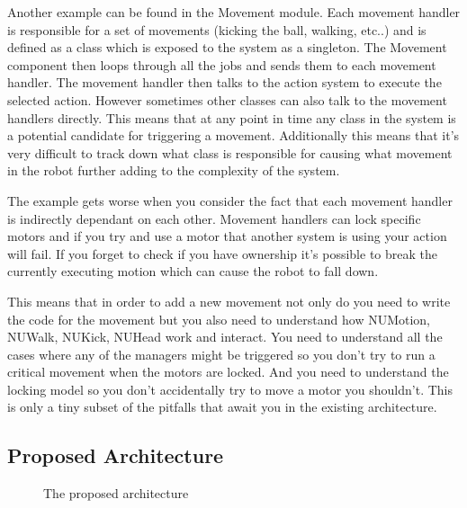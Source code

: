 \documentclass[english,12pt]{scrartcl}
\begin{document}
			Another example can be found in the Movement module.
			Each movement handler is responsible for a set of movements (kicking the ball, walking,
			etc..) and is defined as a class which is exposed to the system as a singleton. The
			Movement component then loops through all the jobs and sends them to each movement
			handler. The movement handler then talks to the action system to execute the selected
			action. However sometimes other classes can also talk to the movement handlers directly.
			This means that at any point in time any class in the system is a potential candidate
			for triggering a movement. Additionally this means that it's very difficult to track
			down what class is responsible for causing what movement in the robot further adding to
			the complexity of the system.

			The example gets worse when you consider the fact that each movement handler is
			indirectly dependant on each other. Movement handlers can lock specific motors and if
			you try and use a motor that another system is using your action will fail. If you
			forget to check if you have ownership it's possible to break the currently executing
			motion which can cause the robot to fall down.

			This means that in order to add a new movement not only do you need to write the code for the movement
			but you also need to understand how NUMotion, NUWalk, NUKick, NUHead work and interact.
			You need to understand all the cases where any of the managers might be triggered so you
			don't try to run a critical movement when the motors are locked. And you need to
			understand the locking model so you don't accidentally try to move a motor you
			shouldn't. This is only a tiny subset of the pitfalls that await you in the existing
			architecture.

			
		\subsection{Proposed Architecture}
			\begin{figure}[h]
				\centering
				\caption {The proposed architecture}
				\label{fig:HighLevelProposedArchitecture}
			\end{figure}
\end{document}
